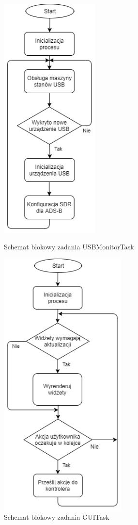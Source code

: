 \documentclass[eng,printmode]{mgr}
\begin{document}
\begin{figure}[htb]
\centering
\begin{minipage}[c]{0.45\linewidth}
\centering
\includegraphics[width=5cm]{plots/usbTask.png}
\vskip 1.3cm
\caption{Schemat blokowy zadania USBMonitorTask}
\end{minipage}
\hfill
\begin{minipage}[c]{0.45\linewidth}
\centering
\includegraphics[width=6.4cm]{plots/guiTask.png}
\caption{Schemat blokowy zadania GUITask}
\end{minipage}
\end{figure}
\end{document}
